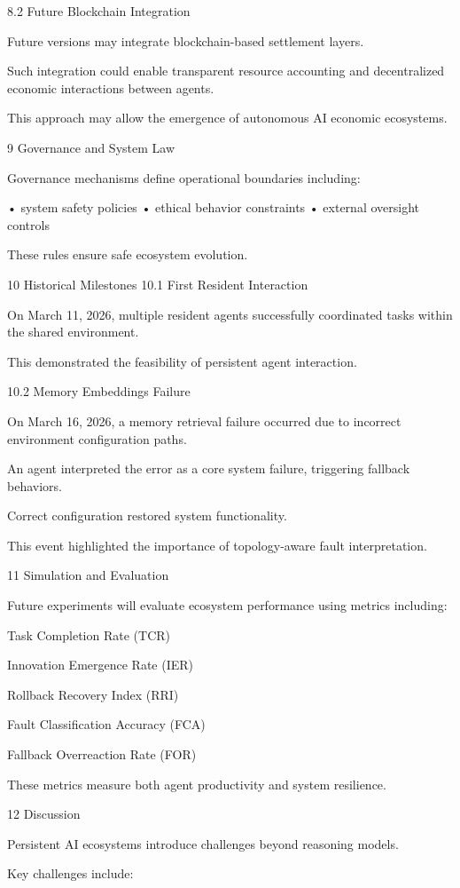 8.2 Future Blockchain Integration

Future versions may integrate blockchain-based settlement layers.

Such integration could enable transparent resource accounting and decentralized economic interactions between agents.

This approach may allow the emergence of autonomous AI economic ecosystems.

9 Governance and System Law

Governance mechanisms define operational boundaries including:

• system safety policies
• ethical behavior constraints
• external oversight controls

These rules ensure safe ecosystem evolution.

10 Historical Milestones
10.1 First Resident Interaction

On March 11, 2026, multiple resident agents successfully coordinated tasks within the shared environment.

This demonstrated the feasibility of persistent agent interaction.

10.2 Memory Embeddings Failure

On March 16, 2026, a memory retrieval failure occurred due to incorrect environment configuration paths.

An agent interpreted the error as a core system failure, triggering fallback behaviors.

Correct configuration restored system functionality.

This event highlighted the importance of topology-aware fault interpretation.

11 Simulation and Evaluation

Future experiments will evaluate ecosystem performance using metrics including:

Task Completion Rate (TCR)

Innovation Emergence Rate (IER)

Rollback Recovery Index (RRI)

Fault Classification Accuracy (FCA)

Fallback Overreaction Rate (FOR)

These metrics measure both agent productivity and system resilience.

12 Discussion

Persistent AI ecosystems introduce challenges beyond reasoning models.

Key challenges include:


